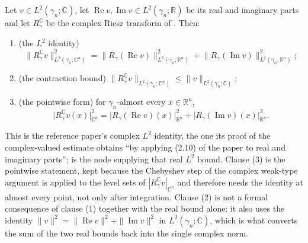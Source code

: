 \begin{lemma}
Let $v \in L^2(\gamma_n;\mathbb{C})$, let $\operatorname{Re} v, \operatorname{Im} v
\in L^2(\gamma_n;\mathbb{R})$ be its real and imaginary parts and let
$R_\gamma^{\mathbb{C}}$ be the complex Riesz transform of
.  Then:
\begin{enumerate}
\item (the $L^2$ identity)
\[
  \bigl\|R_\gamma^{\mathbb{C}} v\bigr\|_{L^2(\gamma_n;\mathbb{C}^n)}^2
    = \bigl\|R_\gamma(\operatorname{Re} v)\bigr\|_{L^2(\gamma_n;\mathbb{R}^n)}^2
      + \bigl\|R_\gamma(\operatorname{Im} v)\bigr\|_{L^2(\gamma_n;\mathbb{R}^n)}^2 ;
\]
\item (the contraction bound)
$\bigl\|R_\gamma^{\mathbb{C}} v\bigr\|_{L^2(\gamma_n;\mathbb{C}^n)}
  \leq \|v\|_{L^2(\gamma_n;\mathbb{C})}$;
\item (the pointwise form) for $\gamma_n$-almost every $x \in \mathbb{R}^n$,
\[
  \bigl|R_\gamma^{\mathbb{C}} v(x)\bigr|_{\mathbb{C}^n}^2
    = \bigl|R_\gamma(\operatorname{Re} v)(x)\bigr|_{\mathbb{R}^n}^2
      + \bigl|R_\gamma(\operatorname{Im} v)(x)\bigr|_{\mathbb{R}^n}^2 .
\]
\end{enumerate}
This is the reference paper's complex $L^2$ identity, the one its proof of the
complex-valued estimate obtains ``by applying (2.10) of the paper to real and
imaginary parts'';  is the node supplying that real
$L^2$ bound.  Clause (3) is the pointwise statement, kept because the Chebyshev
step of the complex weak-type argument is applied to the level sets of
$|R_\gamma^{\mathbb{C}} v|_{\mathbb{C}^n}$ and therefore needs the identity at
almost every point, not only after integration.  Clause (2) is not a formal
consequence of clause (1) together with the real bound alone: it also uses the
identity $\|v\|^2 = \|\operatorname{Re} v\|^2 + \|\operatorname{Im} v\|^2$ in
$L^2(\gamma_n;\mathbb{C})$, which is what converts the sum of the two real
bounds back into the single complex norm.
\end{lemma}
